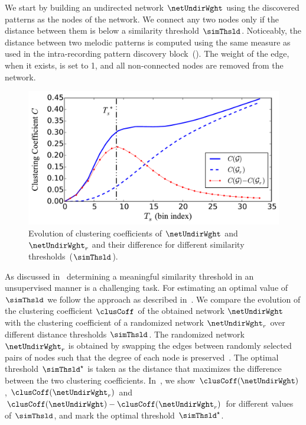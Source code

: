 We start by building an undirected network $\netUndirWght$ using the discovered patterns as the nodes of the network. We connect any two nodes only if the distance between them is below a similarity threshold $\simThsld$. Noticeably, the distance between two melodic patterns is computed using the same measure as used in the intra-recording pattern discovery block~(). The weight of the edge, when it exists, is set to 1, and all non-connected nodes are removed from the network.

\begin{figure}
	\begin{center}
		\includegraphics[width=\figSizeEightyFive]{ch07_ragaRecognition/figures/ClusteringCoffs_40raga_2s.pdf}
	\end{center}
	\caption{Evolution of clustering coefficients of $\netUndirWght$ and $\netUndirWght_r$ and their difference for different similarity thresholds~($\simThsld$).}
	\label{fig:raga_rec_clustering_coff_evolution}
\end{figure}

As discussed in~ determining a meaningful similarity threshold in an unsupervised manner is a challenging task. For estimating an optimal value of $\simThsld$ we follow the approach as described in~. We compare the evolution of the clustering coefficient $\clusCoff$ of the obtained network $\netUndirWght$ with the clustering coefficient of a randomized network $\netUndirWght_r$ over different distance thresholds $\simThsld$. The randomized network $\netUndirWght_r$ is obtained by swapping the edges between randomly selected pairs of nodes such that the degree of each node is preserved~\citep{maslov2002specificity}. The optimal threshold $\simThsld^\star$ is taken as the distance that maximizes the difference between the two clustering coefficients.  In~, we show $\clusCoff(\netUndirWght)$, $\clusCoff(\netUndirWght_r)$ and $\clusCoff(\netUndirWght)-\clusCoff(\netUndirWght_r)$ for different values of $\simThsld$, and mark the optimal threshold $\simThsld^\star$.

